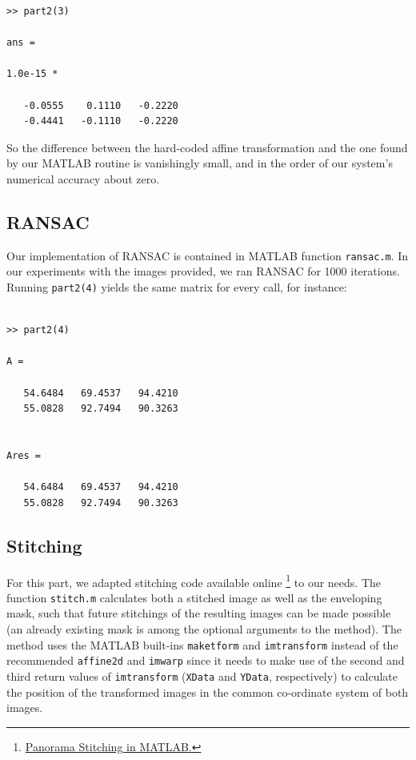 \documentclass[11pt]{article} %
\begin{document}
\begin{lstlisting}
>> part2(3)

ans =

1.0e-15 *

   -0.0555    0.1110   -0.2220
   -0.4441   -0.1110   -0.2220
\end{lstlisting}

So the difference between the hard-coded affine transformation and the one found by our MATLAB routine is vanishingly small, and in the order of our system's numerical accuracy about zero.

\subsection{RANSAC}

	Our implementation of RANSAC is contained in MATLAB function \texttt{ransac.m}. In our experiments with the images provided, we ran RANSAC for 1000 iterations. Running \texttt{part2(4)} yields the same matrix for every call, for instance:
	
\begin{lstlisting}

>> part2(4)

A =

   54.6484   69.4537   94.4210
   55.0828   92.7494   90.3263


Ares =

   54.6484   69.4537   94.4210
   55.0828   92.7494   90.3263
\end{lstlisting}

\subsection{Stitching}
\label{sec:stitch}
For this part, we adapted stitching code available online \footnote{\href{http://tobw.net/index.php?cat_id=2&project=Panorama+Stitching+Demo+in+Matlab}{Panorama Stitching in MATLAB.}} to our needs. The function \texttt{stitch.m} calculates both a stitched image as well as the enveloping mask, such that future stitchings of the resulting images can be made possible (an already existing mask is among the optional arguments to the method). The method uses the MATLAB built-ins \texttt{maketform} and \texttt{imtransform} instead of the recommended \texttt{affine2d} and \texttt{imwarp} since it needs to make use of the second and third return values of \texttt{imtransform} (\texttt{XData} and \texttt{YData}, respectively) to calculate the position of the transformed images in the common co-ordinate system of both images.
\end{document}
